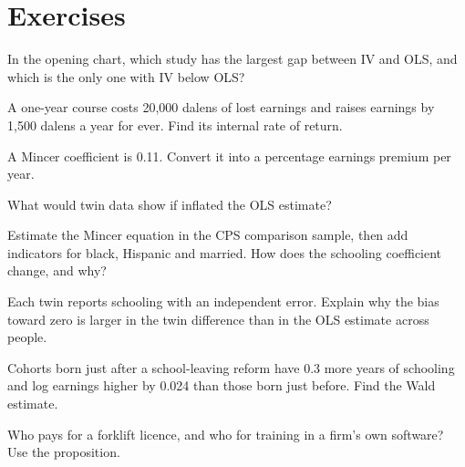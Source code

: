 \section{Exercises}\label{sec:b3:human-capital:exercises}

\begin{exercise}[$\star$]\label{exo:b3:human-capital:1}
In the opening chart, which study has the largest gap between IV and OLS, and which
is the only one with IV below OLS?
\end{exercise}

\begin{exercise}[$\star$]\label{exo:b3:human-capital:2}
A one-year course costs 20{,}000 dalens of lost earnings and raises earnings by 1{,}500 dalens a
year for ever. Find its internal rate of return.
\end{exercise}

\begin{exercise}[$\star$]\label{exo:b3:human-capital:3}
A Mincer coefficient is 0.11. Convert it into a percentage earnings premium per year.
\end{exercise}

\begin{exercise}[$\star$]\label{exo:b3:human-capital:4}
What would twin data show if  inflated the OLS estimate?
\end{exercise}

\begin{exercise}[$\star\star$]\label{exo:b3:human-capital:5}
Estimate the Mincer equation in the CPS comparison sample, then add indicators for
black, Hispanic and married. How does the schooling coefficient change, and why?
\end{exercise}

\begin{exercise}[$\star\star$]\label{exo:b3:human-capital:6}
Each twin reports schooling with an independent error. Explain why the bias toward
zero is larger in the twin difference than in the OLS estimate across people.
\end{exercise}

\begin{exercise}[$\star\star$]\label{exo:b3:human-capital:7}
Cohorts born just after a school-leaving reform have 0.3 more years of schooling and
log earnings higher by 0.024 than those born just before. Find the Wald estimate.
\end{exercise}

\begin{exercise}[$\star\star$]\label{exo:b3:human-capital:8}
Who pays for a forklift licence, and who for training in a firm's own software? Use
the proposition.
\end{exercise}

